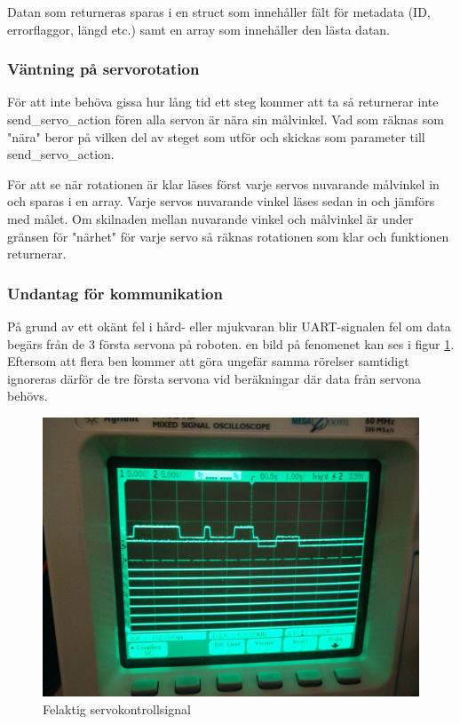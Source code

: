 \documentclass[a4paper,titlepage,12pt]{article}
\begin{document}
	Datan som returneras sparas i en struct som innehåller fält för metadata 
	(ID, errorflaggor, längd etc.) samt en array som innehåller den lästa datan.
	
	\subsubsection{Väntning på servorotation}
	För att inte behöva gissa hur lång tid ett steg kommer att ta så returnerar inte
	send\_servo\_action fören alla servon är nära sin målvinkel. Vad som räknas som "nära"
	beror på vilken del av steget som utför och skickas som parameter till 
	send\_servo\_action.

	För att se när rotationen är klar läses först varje servos nuvarande målvinkel in och
	sparas i en array. Varje servos nuvarande vinkel läses sedan in och jämförs med målet.
	Om skilnaden mellan nuvarande vinkel och målvinkel är under gränsen för "närhet" för
	varje servo så räknas rotationen som klar och funktionen returnerar.

	\subsubsection{Undantag för kommunikation}
	På grund av ett okänt fel i hård- eller mjukvaran blir UART-signalen fel om data 
	begärs från de 3 första servona på roboten. en bild på fenomenet kan ses i figur 
	\ref{fig:servo_tri_state_bug}. Eftersom att flera ben kommer att göra ungefär samma 
	rörelser samtidigt ignoreras därför de tre första servona vid beräkningar där data
	från servona behövs.

	\begin{figure}[htpb]
		\centering
		\includegraphics[width=0.8\linewidth]{images/uart_tri_state.jpg}
		\caption{Felaktig servokontrollsignal}
		\label{fig:servo_tri_state_bug}
	\end{figure}
\end{document}
